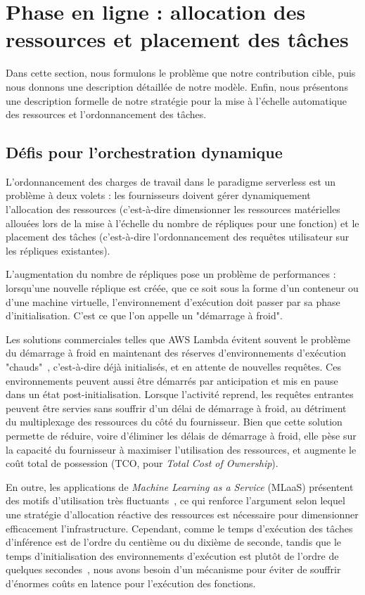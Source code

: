 \section{Phase en ligne : allocation des ressources et placement des tâches}
\label{section:herofake-online}

Dans cette section, nous formulons le problème que notre contribution cible, puis nous donnons une description détaillée de notre modèle. Enfin, nous présentons une description formelle de notre stratégie pour la mise à l'échelle automatique des ressources et l'ordonnancement des tâches.

\subsection{Défis pour l'orchestration dynamique}

L'ordonnancement des charges de travail dans le paradigme serverless est un problème à deux volets : les fournisseurs doivent gérer dynamiquement l'allocation des ressources (c'est-à-dire dimensionner les ressources matérielles allouées lors de la mise à l'échelle du nombre de répliques pour une fonction) et le placement des tâches (c'est-à-dire l'ordonnancement des requêtes utilisateur sur les répliques existantes).

L'augmentation du nombre de répliques pose un problème de performances : lorsqu'une nouvelle réplique est créée, que ce soit sous la forme d'un conteneur ou d'une machine virtuelle, l'environnement d'exécution doit passer par sa phase d'initialisation. C'est ce que l'on appelle un "démarrage à froid".

Les solutions commerciales telles que AWS Lambda évitent souvent le problème du démarrage à froid en maintenant des réserves d'environnements d'exécution "chauds"~\cite{vahidiniaColdStartServerless2020}, c'est-à-dire déjà initialisés, et en attente de nouvelles requêtes. Ces environnements peuvent aussi être démarrés par anticipation et mis en pause dans un état post-initialisation. Lorsque l'activité reprend, les requêtes entrantes peuvent être servies sans souffrir d'un délai de démarrage à froid, au détriment du multiplexage des ressources du côté du fournisseur. Bien que cette solution permette de réduire, voire d'éliminer les délais de démarrage à froid, elle pèse sur la capacité du fournisseur à maximiser l'utilisation des ressources, et augmente le coût total de possession (TCO, pour \textit{Total Cost of Ownership}).

En outre, les applications de \textit{Machine Learning as a Service} (MLaaS) présentent des motifs d'utilisation très fluctuants~\cite{gujaratiSwayamDistributedAutoscaling2017}, ce qui renforce l'argument selon lequel une stratégie d'allocation réactive des ressources est nécessaire pour dimensionner efficacement l'infrastructure. Cependant, comme le temps d'exécution des tâches d'inférence est de l'ordre du centième ou du dixième de seconde, tandis que le temps d'initialisation des environnements d'exécution est plutôt de l'ordre de quelques secondes~\cite{mancoMyVMLighter2017}, nous avons besoin d'un mécanisme pour éviter de souffrir d'énormes coûts en latence pour l'exécution des fonctions.


